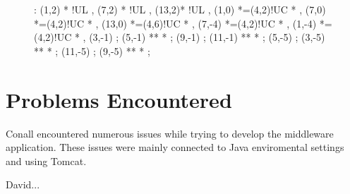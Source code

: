 \documentclass[a4paper,12pt]{article}
\begin{document}
\begin{figure}[hp]
\xy<1cm,0cm>:
\POS (1,2) * !UL ,
\POS (7,2) * !UL ,
\POS (13,2)* !UL ,
(1,0) *=(4,2)!UC *\frm{-} ,
(7,0) *=(4,2)!UC *\frm{-} ,
(13,0) *=(4,6)!UC *\frm{-} ,
(7,-4) *=(4,2)!UC *\frm{-} ,
(1,-4) *=(4,2)!UC *\frm{-} ,
(3,-1) ; (5,-1)  **\dir{-}  *\dir{>} ;
(9,-1) ; (11,-1) **\dir{-} *\dir{>} ;
(5,-5)  ; (3,-5) **\dir{-}  *\dir{>} ;
(11,-5) ; (9,-5) **\dir{-} *\dir{>} ;
\endxy

\end{figure}


\section{Problems Encountered}

Conall encountered numerous issues while trying to develop the
middleware application. These issues were mainly connected to Java
enviromental settings and using Tomcat.

David...
\end{document}
